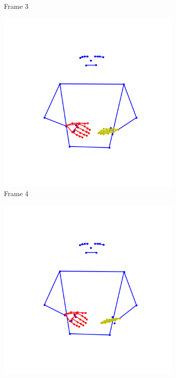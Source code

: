 \begin{figure}[t]
\begin{subfigure}[t]{0.3\textwidth}
		\caption{Frame 3}
		\label{f:frame3}
	\end{subfigure}
	\begin{subfigure}[t]{0.3\textwidth}
		\centering
		\includegraphics[align=t,width=0.9\linewidth, height =0.9\linewidth]{Graphics/interpol_aborto_amar_4.png}
		\caption{Frame 4 }
		\label{f:frame4}
	\end{subfigure}
	\begin{subfigure}[t]{0.3\textwidth}
		\centering
		\includegraphics[align=t,width=0.9\linewidth, height =0.9\linewidth]{Graphics/interpol_aborto_amar_5.png}

\end{subfigure}
\end{figure}
